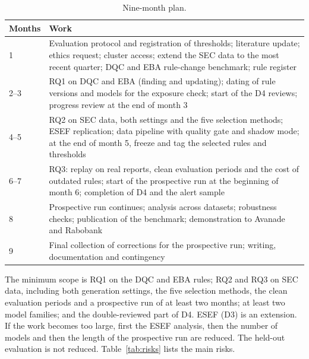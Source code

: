 \documentclass[11pt,a4paper]{article}
\begin{document}
\begin{table}[htb]
\centering
\small
\begin{tabularx}{\textwidth}{P{1.6cm} L}
\toprule
Months & Work \\
 & Evaluation protocol and registration of thresholds; literature update; ethics request; cluster access; extend the SEC data to the most recent quarter; DQC and EBA rule-change benchmark; rule register \\
2--3 & RQ1 on DQC and EBA (finding and updating); dating of rule versions and models for the exposure check; start of the D4 reviews; progress review at the end of month 3 \\
4--5 & RQ2 on SEC data, both settings and the five selection methods; ESEF replication; data pipeline with quality gate and shadow mode; at the end of month 5, freeze and tag the selected rules and thresholds \\
6--7 & RQ3: replay on real reports, clean evaluation periods and the cost of outdated rules; start of the prospective run at the beginning of month 6; completion of D4 and the alert sample \\
8 & Prospective run continues; analysis across datasets; robustness checks; publication of the benchmark; demonstration to Avanade and Rabobank \\
9 & Final collection of corrections for the prospective run; writing, documentation and contingency \\
\bottomrule
\end{tabularx}
\caption{Nine-month plan.}
\label{tab:plan}
\end{table}

The minimum scope is RQ1 on the DQC and EBA rules; RQ2 and RQ3 on SEC data, including both generation settings, the five selection methods, the clean evaluation periods and a prospective run of at least two months; at least two model families; and the double-reviewed part of D4. ESEF (D3) is an extension. If the work becomes too large, first the ESEF analysis, then the number of models and then the length of the prospective run are reduced. The held-out evaluation is not reduced. Table~\ref{tab:risks} lists the main risks.
\end{document}
